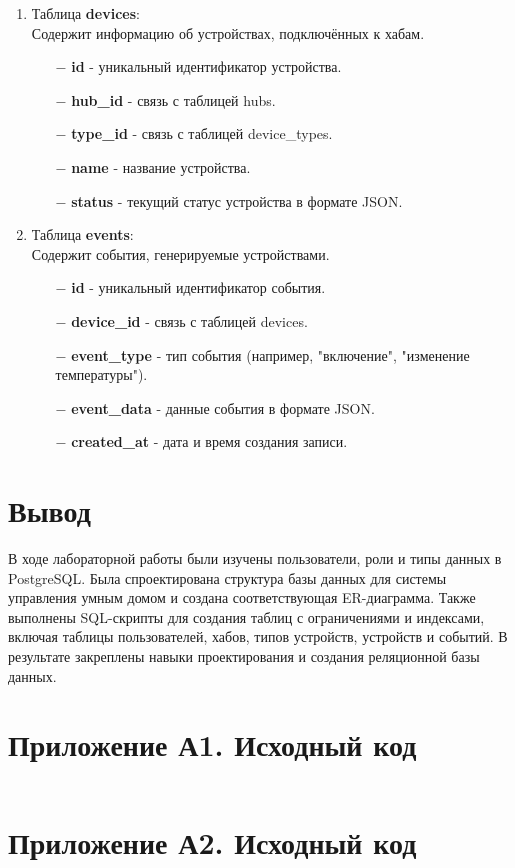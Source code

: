 \documentclass[oneside,a4paper,14pt]{extarticle}
\begin{document}
\begin{enumerate}
  \item Таблица \textbf{devices}:\\
        Содержит информацию об устройствах, подключённых к хабам.
        \begin{itemize}
          \item[$-$] \textbf{id} - уникальный идентификатор устройства.
          \item[$-$] \textbf{hub\_id} - связь с таблицей hubs.
          \item[$-$] \textbf{type\_id} - связь с таблицей device\_types.
          \item[$-$] \textbf{name} - название устройства.
          \item[$-$] \textbf{status} - текущий статус устройства в формате JSON.
        \end{itemize}

  \item Таблица \textbf{events}:\\
        Содержит события, генерируемые устройствами.
        \begin{itemize}
          \item[$-$] \textbf{id} - уникальный идентификатор события.
          \item[$-$] \textbf{device\_id} - связь с таблицей devices.
          \item[$-$] \textbf{event\_type} - тип события (например, "включение", "изменение температуры").
          \item[$-$] \textbf{event\_data} - данные события в формате JSON.
          \item[$-$] \textbf{created\_at} - дата и время создания записи.
        \end{itemize}
\end{enumerate}


\section*{Вывод}

В ходе лабораторной работы были изучены пользователи, роли и типы данных в PostgreSQL. Была спроектирована структура базы данных для системы управления умным домом и создана соответствующая ER-диаграмма. Также выполнены SQL-скрипты для создания таблиц с ограничениями и индексами, включая таблицы пользователей, хабов, типов устройств, устройств и событий. В результате закреплены навыки проектирования и создания реляционной базы данных.
\newpage


\section*{Приложение А1. Исходный код}
\inputminted{Dockerfile}{code/Containerfile}

\section*{Приложение А2. Исходный код}
\inputminted{sql}{code/init.sql}
\end{document}

